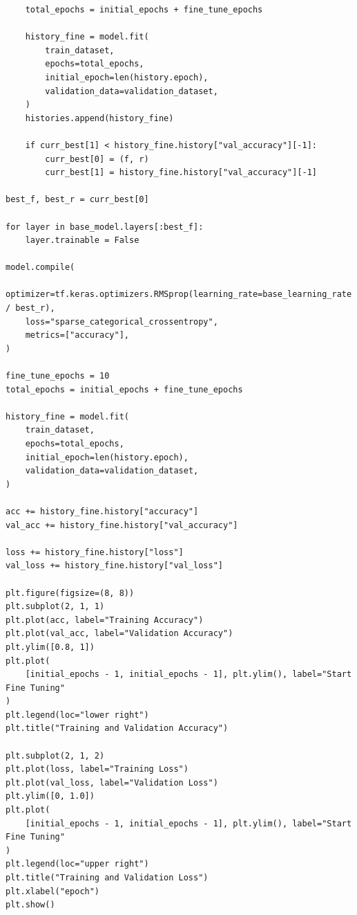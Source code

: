 \documentclass[11pt]{article}
\begin{document}
\begin{verbatim}
    total_epochs = initial_epochs + fine_tune_epochs

    history_fine = model.fit(
        train_dataset,
        epochs=total_epochs,
        initial_epoch=len(history.epoch),
        validation_data=validation_dataset,
    )
    histories.append(history_fine)

    if curr_best[1] < history_fine.history["val_accuracy"][-1]:
        curr_best[0] = (f, r)
        curr_best[1] = history_fine.history["val_accuracy"][-1]

best_f, best_r = curr_best[0]

for layer in base_model.layers[:best_f]:
    layer.trainable = False

model.compile(
    optimizer=tf.keras.optimizers.RMSprop(learning_rate=base_learning_rate / best_r),
    loss="sparse_categorical_crossentropy",
    metrics=["accuracy"],
)

fine_tune_epochs = 10
total_epochs = initial_epochs + fine_tune_epochs

history_fine = model.fit(
    train_dataset,
    epochs=total_epochs,
    initial_epoch=len(history.epoch),
    validation_data=validation_dataset,
)

acc += history_fine.history["accuracy"]
val_acc += history_fine.history["val_accuracy"]

loss += history_fine.history["loss"]
val_loss += history_fine.history["val_loss"]

plt.figure(figsize=(8, 8))
plt.subplot(2, 1, 1)
plt.plot(acc, label="Training Accuracy")
plt.plot(val_acc, label="Validation Accuracy")
plt.ylim([0.8, 1])
plt.plot(
    [initial_epochs - 1, initial_epochs - 1], plt.ylim(), label="Start Fine Tuning"
)
plt.legend(loc="lower right")
plt.title("Training and Validation Accuracy")

plt.subplot(2, 1, 2)
plt.plot(loss, label="Training Loss")
plt.plot(val_loss, label="Validation Loss")
plt.ylim([0, 1.0])
plt.plot(
    [initial_epochs - 1, initial_epochs - 1], plt.ylim(), label="Start Fine Tuning"
)
plt.legend(loc="upper right")
plt.title("Training and Validation Loss")
plt.xlabel("epoch")
plt.show()

\end{verbatim}
\end{document}
